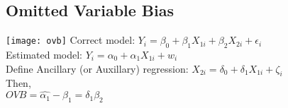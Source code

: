 \subsection*{Omitted Variable Bias}
\texttt{[image: ovb]}
Correct model: $Y_i=\beta_0+\beta_1 X_{1i}+\beta_2 X_{2i}+\epsilon_i$\\
Estimated model: $Y_i=\alpha_0+\alpha_1 X_{1i}+w_i$\\
Define Ancillary (or Auxillary) regression: $X_{2i}=\delta_0+\delta_1 X_{1i}+\zeta_i$\\
Then,\\
${OVB}=\hat{\alpha_1}-\beta_1=\delta_1 \beta_2$
